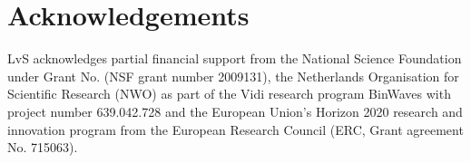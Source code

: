 \documentclass[twocolumn]{aastex63}
\begin{document}
\section*{Acknowledgements}
LvS acknowledges partial financial support from the  National Science Foundation under Grant No. (NSF grant number 2009131), 
the Netherlands Organisation for Scientific Research (NWO) as part of the Vidi research program BinWaves with project number 639.042.728 
and the European Union’s Horizon 2020 research and innovation program from the European Research Council (ERC, Grant agreement No. 715063).


\newpage

\end{document}
